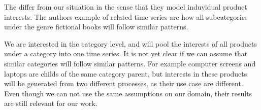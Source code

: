 The \cite{Bandara2019} differ from our situation in the sense that they model
induvidual product interests. The authors example of related time series are how
all subcategories under the genre fictional books will follow similar patterns.

We are interested in the category level, and will pool the interests of all products under
a category into one time series. It is not yet clear if we can assume that similar categories 
will follow similar patterns. 
For example computer screens and laptops are childs of the same category parent, 
but interests in these products will be generated from two different processes, as their 
use case are different.
Even though we can not use the same assumptions on our domain, their results are still relevant
for our work.

